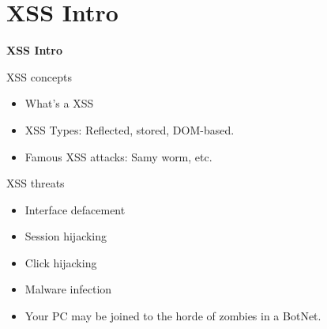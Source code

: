 
\section{XSS Intro}

\begin{frame}[plain]
    \begin{center}
      \Huge\bfseries
      XSS Intro
    \end{center}
\end{frame}

\begin{frame}{XSS concepts}
  \begin{itemize}
    \item What's a XSS
    \item XSS Types: Reflected, stored, DOM-based.
    \item Famous XSS attacks: Samy worm, etc.
  \end{itemize}
\end{frame}

\begin{frame}{XSS threats}
  \begin{itemize}
    \item Interface defacement
    \item Session hijacking
    \item Click hijacking
    \item Malware infection
    \item Your PC may be joined to the horde of zombies in a BotNet.
  \end{itemize}
\end{frame}
